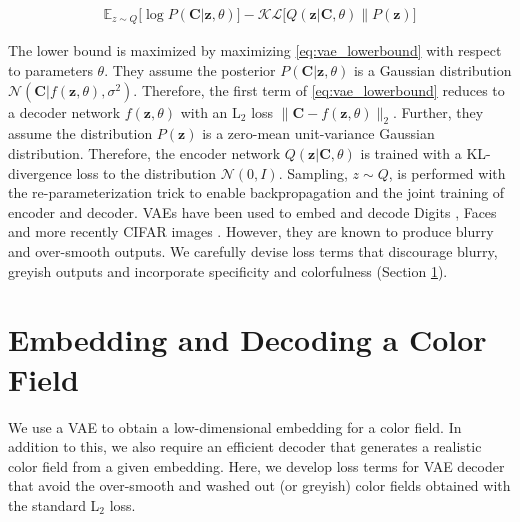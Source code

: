 \documentclass[10pt,twocolumn,letterpaper]{article}
\begin{document}
\begin{equation}
\label{eq:vae_lowerbound}
\begin{aligned}
\mathbb{E}_{z \sim Q} \lbrack \log P(\mathbf{C}|\mathbf{z}, \theta)\rbrack - 
\mathcal{KL}\lbrack Q(\mathbf{z} | \mathbf{C}, \theta) \| P(\mathbf{z}) \rbrack
\end{aligned}
\end{equation}

The lower bound is maximized by maximizing \autoref{eq:vae_lowerbound}
with respect to parameters $\theta$. They assume the posterior $P(\mathbf{C}|\mathbf{z}, \theta)$ 
is a Gaussian distribution $\mathcal{N}(\mathbf{C} | f(\mathbf{z}, \theta), \sigma^{2})$. 
Therefore, the first term of \autoref{eq:vae_lowerbound} reduces to a decoder network $f(\mathbf{z}, \theta)$
with an L$_2$ loss $\| \mathbf{C} - f(\mathbf{z}, \theta)\|_{2}$. Further, they assume 
the distribution $P(\mathbf{z})$ is a zero-mean unit-variance Gaussian distribution. Therefore, the 
encoder network $Q(\mathbf{z}|\mathbf{C}, \theta)$ is trained with a KL-divergence loss 
to the distribution $\mathcal{N}(0, I)$. Sampling, $z \sim Q$, is performed with the 
re-parameterization trick to enable backpropagation and the joint training of 
encoder and decoder. VAEs have been used to embed and decode Digits 
\cite{Draw,SemiSup,AEB}, Faces \cite{DCIGN,Attr2Img} and more recently CIFAR images 
\cite{Draw,Iavae}. However, they are known to produce blurry and over-smooth 
outputs. We carefully devise loss terms that discourage blurry, greyish outputs and 
incorporate specificity and colorfulness (Section \ref{sec:vae}). \\

\section{Embedding and Decoding a Color Field}\label{sec:vae}

We use a VAE to obtain a low-dimensional embedding for a color field. In addition 
to this, we also require an efficient decoder that generates a realistic color field from a given
embedding. Here, we develop loss terms for VAE decoder that avoid the over-smooth and washed
out (or greyish) color fields obtained with the standard L$_2$ loss. 
\end{document}
